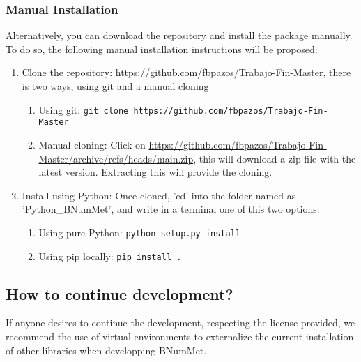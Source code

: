 \subsubsection*{Manual Installation}
Alternatively, you can download the repository and install the package manually. To do so, the following manual installation instructions will be proposed:
\begin{enumerate}
    \item Clone the repository: \href{https://github.com/fbpazos/Trabajo-Fin-Master}{https://github.com/fbpazos/Trabajo-Fin-Master}, there is two ways, using git and a manual cloning
    \begin{enumerate}
        \item Using git: \lstinline|git clone https://github.com/fbpazos/Trabajo-Fin-Master|
        
        \item Manual cloning: Click on \href{https://github.com/fbpazos/Trabajo-Fin-Master/archive/refs/heads/main.zip}{https://github.com/fbpazos/Trabajo-Fin-Master/archive/refs/heads/main.zip}, this will download a zip file with the latest version. Extracting this will provide the cloning.
    \end{enumerate}

    \item Install using Python: Once cloned, 'cd' into the folder named as 'Python\_BNumMet', and write in a terminal one of this two options:
    \begin{enumerate}
        \item Using pure Python: \lstinline|python setup.py install|
        \item Using pip locally: \lstinline|pip install .|
    \end{enumerate}
    
\end{enumerate}


\subsection*{How to continue development?}
If anyone desires to continue the development, respecting the license provided, we recommend the use of virtual environments to externalize the current installation of other libraries when developping BNumMet. 

